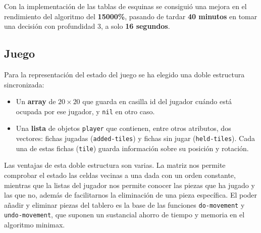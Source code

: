 Con la implementación de las tablas de esquinas se consiguió una mejora en el
rendimiento del algoritmo del \textbf{15000\%}, pasando de tardar \textbf{40
minutos} en tomar una decisión con profundidad 3, a solo \textbf{16 segundos}.

\subsection{Juego}

Para la representación del estado del juego se ha elegido una doble estructura
sincronizada:

\begin{itemize}
	\item Un \textbf{array} de $20 \times 20$ que guarda en casilla id del
		jugador cuándo está ocupada por ese jugador, y \texttt{nil} en
		otro caso.
	\item Una \textbf{lista} de objetos \texttt{player} que contienen, entre
		otros atributos, dos vectores: fichas jugadas
		(\texttt{added-tiles}) y fichas sin jugar (\texttt{held-tiles}).
		Cada una de estas fichas (\texttt{tile}) guarda información
		sobre su posición y rotación.
\end{itemize}

Las ventajas de esta doble estructura son varias. La matriz nos permite
comprobar el estado las celdas vecinas a una dada con un orden constante,
mientras que la listas del jugador nos permite conocer las piezas que ha jugado
y las que no, además de facilitarnos la eliminación de una pieza específica. El
poder añadir y eliminar piezas del tablero es la base de las funciones
\texttt{do-movement} y \texttt{undo-movement}, que suponen un sustancial ahorro
de tiempo y memoria en el algoritmo minimax.
